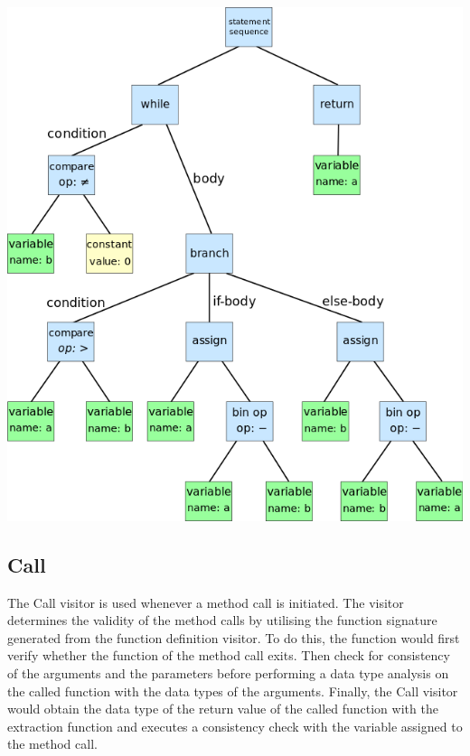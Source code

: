 \documentclass{l4proj}
\begin{document}
\begin{center}
    \includegraphics[width=\textwidth]{images/AST_diagram.png}
    \label{fig:AST} 
\end{center}

\subsection{Call}
\label{call}
The Call visitor is used whenever a method call is initiated. The visitor determines the validity of the method calls by utilising the function signature generated from the function definition visitor. To do this, the function would first verify whether the function of the method call exits. Then check for consistency of the arguments and the parameters before performing a data type analysis on the called function with the data types of the arguments. Finally, the Call visitor would obtain the data type of the return value of the called function with the extraction function and executes a consistency check with the variable assigned to the method call.
\end{document}
